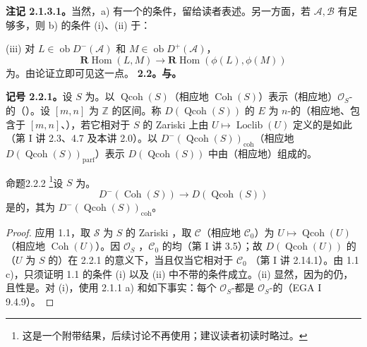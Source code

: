 \textbf{注记 2.1.3.1。}当然，a) 有一个的条件，留给读者表述。另一方面，若 $\mathcal A,\mathcal B$ 有足够多，则 b) 的条件 (i)、(ii) 于：

(iii) 对 $L\in\operatorname{ob}D^-(\mathcal A)$ 和 $M\in\operatorname{ob}D^+(\mathcal A)$，
\[
\mathbf R\operatorname{Hom}(L,M)\longrightarrow\mathbf R\operatorname{Hom}(\phi(L),\phi(M))
\]
为。由论证立即可见这一点。
\textbf{2.2。与。}

\textbf{记号 2.2.1。}设 $S$ 为。以 $\operatorname{Qcoh}(S)$（相应地 $\operatorname{Coh}(S)$）表示（相应地）$\mathcal O_S$-的（）。设 $[m,n]$ 为 $\mathbb Z$ 的区间。称 $D(\operatorname{Qcoh}(S))$ 的 $E$ 为 $n$-的（相应地、包含于 $[m,n]$、），若它相对于 $S$ 的 Zariski 上由 $U\mapsto\operatorname{Loclib}(U)$ 定义的是如此（第 I 讲 2.3、4.7 及本讲 2.0）。以 $D^-(\operatorname{Qcoh}(S))_{\mathrm{coh}}$（相应地 $D(\operatorname{Qcoh}(S))_{\mathrm{parf}}$）表示 $D(\operatorname{Qcoh}(S))$ 中由（相应地）组成的。
\begin{SGAresult}{命题}{2.2.2}
\footnote{这是一个附带结果，后续讨论不再使用；建议读者初读时略过。}设 $S$ 为。
\[
D^-(\operatorname{Coh}(S))\longrightarrow D(\operatorname{Qcoh}(S))
\]
是的，其为 $D^-(\operatorname{Qcoh}(S))_{\mathrm{coh}}$。
\end{SGAresult}
\begin{proof}
应用 1.1，取 $\mathcal S$ 为 $S$ 的 Zariski ，取 $\mathcal C$（相应地 $\mathcal C_0$）为 $U\mapsto\operatorname{Qcoh}(U)$（相应地 $\operatorname{Coh}(U)$）。因 $\mathcal O_S$ ，$\mathcal C_0$ 的均（第 I 讲 3.5）；故 $D(\operatorname{Qcoh}(U))$ 的（$U$ 为 $S$ 的）在 2.2.1 的意义下，当且仅当它相对于 $\mathcal C_0$ （第 I 讲 2.14.1）。由 1.1 c)，只须证明 1.1 的条件 (i) 以及 (ii) 中不带的条件成立。(ii) 显然，因为的仍，且性是。对 (i)，使用 2.1.1 a) 和如下事实：每个 $\mathcal O_S$-都是 $\mathcal O_S$-的（EGA I 9.4.9）。
\end{proof}
